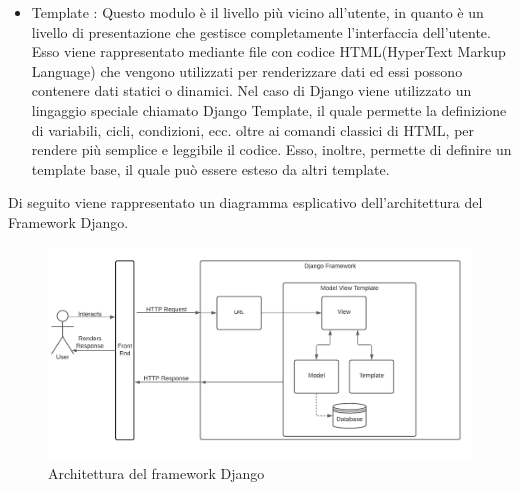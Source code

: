 \begin{itemize}
    \item Template : Questo modulo è il livello più vicino all'utente, in quanto è un livello di presentazione che gestisce completamente l'interfaccia dell'utente. Esso viene rappresentato mediante file con codice HTML(HyperText Markup Language) che vengono utilizzati per renderizzare dati ed essi possono contenere dati statici o dinamici. Nel caso di Django viene utilizzato un lingaggio speciale chiamato Django Template, il quale permette la definizione di variabili, cicli, condizioni, ecc. oltre ai comandi classici di HTML, per rendere più semplice e leggibile il codice. Esso, inoltre, permette di definire un template base, il quale può essere esteso da altri template. \cite{django_template}
\end{itemize}


Di seguito viene rappresentato un diagramma esplicativo dell'architettura del Framework Django.

\begin{figure}[H]
    \centering
    \includegraphics[scale=0.42]{images/architettura_django.png}
    \caption{Architettura del framework Django}
    \label{img:architettura_django}

\end{figure}

